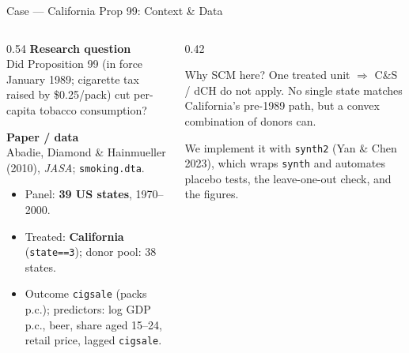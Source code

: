 \documentclass[main.tex]{subfiles}
\begin{document}
\begin{frame}{Case --- California Prop 99: Context \& Data}

  \begin{columns}[T]
    \begin{column}{0.54\textwidth}
      \textbf{Research question}\\
      Did Proposition 99 (in force January 1989; cigarette tax raised by
      \$0.25/pack) cut per-capita tobacco consumption?

      \medskip
      \textbf{Paper / data}\\
      Abadie, Diamond \& Hainmueller (2010), \textit{JASA};
      \texttt{smoking.dta}.
      \begin{itemize}\small
        \item Panel: \textbf{39 US states}, 1970--2000.
        \item Treated: \textbf{California} (\texttt{state==3});
          donor pool: 38 states.
        \item Outcome \texttt{cigsale} (packs p.c.); predictors: log GDP p.c.,
          beer, share aged 15--24, retail price, lagged \texttt{cigsale}.
      \end{itemize}
    \end{column}
    \begin{column}{0.42\textwidth}
      \begin{block}{Why SCM here?}
        \footnotesize
        One treated unit $\Rightarrow$ C\&S / dCH do not apply. No single
        state matches California's pre-1989 path, but a convex combination
        of donors can.
      \end{block}
      \medskip
      \footnotesize We implement it with \texttt{synth2} (Yan \& Chen 2023),
      which wraps \texttt{synth} and automates placebo tests, the
      leave-one-out check, and the figures.
    \end{column}
  \end{columns}

\end{frame}
\end{document}
